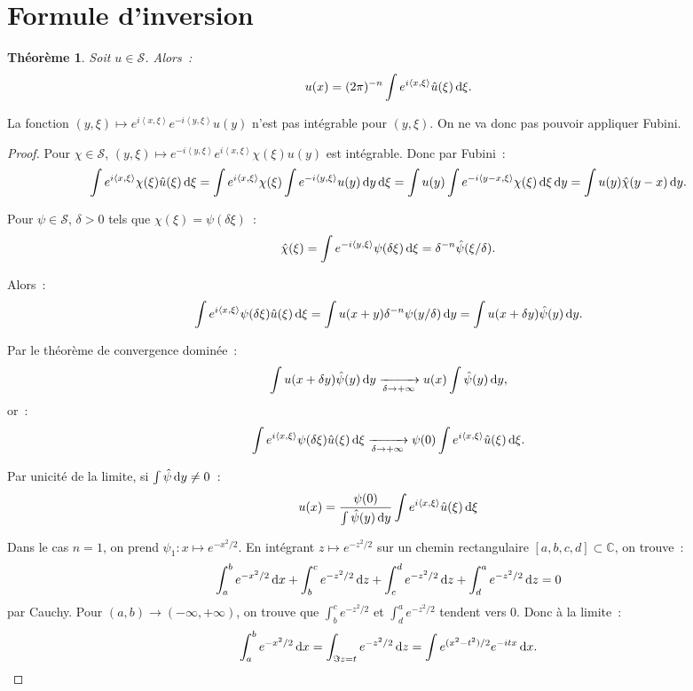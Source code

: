 \documentclass{report}
\newcommand{\C}{{\mathbb C}}
\newcommand{\scpr}[2]{\left\langle#1, #2\right\rangle}
\newcommand{\pinfty}{{+\infty}}
\newcommand{\minfty}{{-\infty}}
\newcommand{\dx}{\dif x}
\newtheorem{thm}{Théorème}[chapter]
\theoremstyle{definition}
\theoremstyle{remark}
\begin{document}
\section{Formule d'inversion}

\begin{thm}\label{thm:inversion Fourier} Soit $u \in \mathcal S$. Alors~:
\begin{equation}\label{eq:inversion Fourier}
	u(x) = (2\pi)^{-n}\int e^{i\scpr x\xi}\hat u(\xi)\dif\xi.
\end{equation}
\end{thm}

La fonction $(y, \xi) \mapsto e^{i\scpr x\xi}e^{-i\scpr y\xi}u(y)$ n'est pas intégrable pour $(y, \xi)$. On ne va donc pas pouvoir appliquer Fubini.

\begin{proof} Pour $\chi \in \mathcal S$, $(y, \xi) \mapsto e^{-i\scpr y\xi}e^{i\scpr x\xi}\chi(\xi)u(y)$ est intégrable. Donc par Fubini~:
\[\int e^{i\scpr x\xi}\chi(\xi)\hat u(\xi)\dif\xi = \int e^{i\scpr x\xi}\chi(\xi)\int e^{-i\scpr y\xi}u(y)\dif y\dif\xi
	= \int u(y)\int e^{-i\scpr {y-x}\xi}\chi(\xi)\dif\xi \dif y = \int u(y)\hat \chi(y-x)\dif y.\]

Pour $\psi \in \mathcal S$, $\delta > 0$ tels que $\chi(\xi) = \psi(\delta\xi)$~:
\[\hat \chi(\xi) = \int e^{-i\scpr y\xi}\psi(\delta\xi)\dif\xi = \delta^{-n}\hat \psi(\xi/\delta).\]

Alors~:
\[\int e^{i\scpr x\xi}\psi(\delta\xi)\hat u(\xi)\dif\xi = \int u(x+y)\delta^{-n}\psi(y/\delta)\dif y = \int u(x+\delta y)\hat \psi(y)\dif y.\]

Par le théorème de convergence dominée~:
\[\int u(x+\delta y)\hat \psi(y)\dif y \xrightarrow[\delta \to \pinfty]{} u(x)\int \hat \psi(y)\dif y,\]
or~:
\[\int e^{i\scpr x\xi}\psi(\delta \xi)\hat u(\xi)\dif\xi \xrightarrow[\delta \to \pinfty]{} \psi(0)\int e^{i\scpr x\xi}\hat u(\xi)\dif\xi.\]

Par unicité de la limite, si $\int \hat \psi \dif y\neq 0$~:
\[u(x) = \frac {\psi(0)}{\int\hat \psi(y)\dif y}\int e^{i\scpr x\xi}\hat u(\xi)\dif\xi\]

Dans le cas $n=1$, on prend $\psi_1 : x \mapsto e^{-x^2/2}$. En intégrant $z \mapsto e^{-z^2/2}$ sur un chemin rectangulaire $[a,b,c,d] \subset \C$, on trouve~:
\[\int_a^b e^{-x^2/2}\dx + \int_b^c e^{-z^2/2}\dif z + \int_c^d e^{-z^2/2}\dif z + \int_d^a e^{-z^2/2}\dif z = 0\]
par Cauchy. Pour $(a, b) \to (\minfty, \pinfty)$, on trouve que $\int_b^c e^{-z^2/2}$ et $\int_d^a e^{-z^2/2}$ tendent vers $0$. Donc à la limite~:
\[\int_a^b e^{-x^2/2}\dx = \int_{\Im z = t}e^{-z^2/2}\dif z = \int e^{(x^2-t^2)/2}e^{-itx}\dx.\]


\end{proof}
\end{document}
